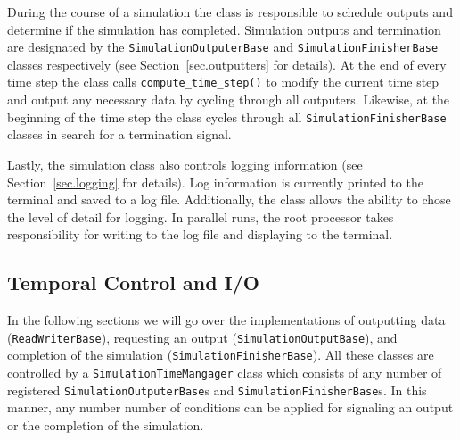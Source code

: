 During the course of a simulation the class is responsible to schedule outputs and
determine if the simulation has completed. Simulation outputs and termination are 
designated by the \lstinline{SimulationOutputerBase} and \lstinline{SimulationFinisherBase} 
classes respectively (see Section~\ref{sec.outputters} for details). At the end of every time
step the class calls \lstinline{compute_time_step()} to modify the current time step and
output any necessary data by cycling through all outputers. Likewise, at the beginning of
the time step the class cycles through all \lstinline{SimulationFinisherBase} classes 
in search for a termination signal.

Lastly, the simulation class also controls logging information (see Section~\ref{sec.logging}
for details). Log information is currently printed to the terminal and saved to a log file.
Additionally, the class allows the ability to chose the level of detail for logging.
In parallel runs, the root processor takes responsibility for writing to the log file
and displaying to the terminal.


\subsection{Temporal Control and I/O}
In the following sections we will go over the implementations of outputting data 
(\lstinline{ReadWriterBase}), requesting an output (\lstinline{SimulationOutputBase}), and completion
of the simulation (\lstinline{SimulationFinisherBase}). All these classes are controlled by a
\lstinline{SimulationTimeMangager} class which consists of any number of registered
\lstinline{SimulationOutputerBase}s and \lstinline{SimulationFinisherBase}s. In this manner,
any number number of conditions can be applied for signaling an output or the
completion of the simulation.

